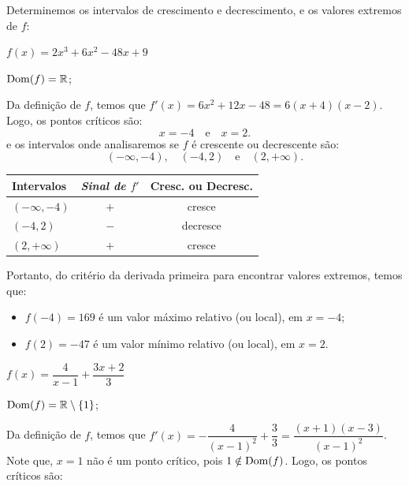 \cleardoublepage\documentclass[../main.tex]{subfiles}
\begin{document}
\begin{ex}
 Determinemos os intervalos de crescimento e decrescimento, e os valores extremos de \(f\):
 \begin{compactenum}[a)]
 \item \(f(x)=2x^3+6x^2-48x+9\)
 
 \begin{solution}
 \begin{compactenum}[1.]
 \item \({\rm Dom}(f)=\mathbb{R}\);
\item Da definição de \(f\), temos que \(f'(x)=6x^2+12x-48=6(x+4)(x-2)\).
Logo, os pontos críticos são:
\[ x=-4\quad \mbox{e}\quad x=2. \]
e os intervalos onde analisaremos se \(f\) é crescente ou decrescente são:
\[ (-\infty,-4),\quad(-4,2)\quad \mbox{e}\quad (2,+\infty). \]
\begin{center}
  \begin{tabular}{l|c|c}
  \toprule
    \textbf{Intervalos} &	\emph{Sinal de \(f'\)} &	\textbf{Cresc. ou Decresc.}\\\hline
\((-\infty,-4)\) &\(+\)& cresce\\\hline
\((-4,2)\)&\(-\)&decresce\\\hline
\((2,+\infty)\)&\(+\)& cresce\\
\bottomrule
  \end{tabular}
  \end{center}
   \end{compactenum}
 Portanto, do critério da derivada primeira para encontrar valores extremos, temos que:
\begin{itemize}
    \item \(f(-4)=169\) é um valor máximo relativo (ou local), em \(x=-4\);
\item \(f(2)=-47\) é um valor mínimo relativo (ou local), em \(x=2\).
\end{itemize}
 \end{solution}
 \item \(f(x)=\dfrac{4}{x-1}+\dfrac{3x+2}{3}\)
 
 \begin{solution}
 \begin{compactenum}[1.]
 \item \({\rm Dom}(f)=\mathbb{R}\setminus\{1\}\);
\item Da definição de \(f\), temos que \(f'(x)=-\dfrac{4}{(x-1)^2}+ \dfrac{3}{3}=\dfrac{(x+1)(x-3)}{(x-1)^2}\).
Note que, \(x=1\) não é um ponto crítico, pois \(1\notin {\rm Dom}(f)\). Logo, os pontos críticos são:


\end{compactenum}
\end{solution}
\end{compactenum}
\end{ex}
\end{document}
